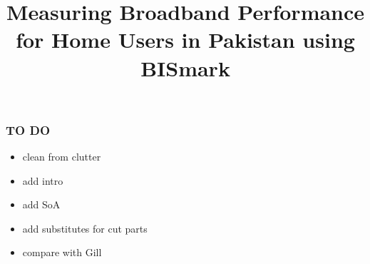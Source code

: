 \documentclass{sig-alternate-10pt}
\begin{document}
\begin{notecommenti}
\subsubsection{TO DO}
\begin{itemize}
\item clean from clutter
\item add intro
\item add SoA
\item add substitutes for cut parts
\item compare with Gill
\end{itemize}
\end{notecommenti}


\title{Measuring Broadband Performance for Home Users in Pakistan using BISmark
\\}
%
%
%
%
%
\end{document}
